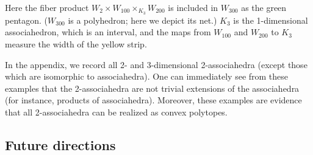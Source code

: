 \documentclass[11pt]{amsart}
\theoremstyle{definition}
\theoremstyle{remark}
\theoremstyle{plain}
\begin{document}
\begin{enumerate}
\begin{enumerate}
\begin{figure}[H]
\centering
\def\svgwidth{0.85\columnwidth}

\end{figure}

\noindent
Here the fiber product $W_2 \times W_{100} \times_{K_3} W_{200}$ is included in $W_{300}$ as the green pentagon.
($W_{300}$ is a polyhedron; here we depict its net.)
$K_3$ is the 1-dimensional associahedron, which is an interval, and the maps from $W_{100}$ and $W_{200}$ to $K_3$ measure the width of the yellow strip.
\end{enumerate}

\medskip

\noindent{\bf\S\ref{app:ex}:}
In the appendix, we record all 2- and 3-dimensional 2-associahedra (except those which are isomorphic to associahedra).
One can immediately see from these examples that the 2-associahedra are not trivial extensions of the associahedra (for instance, products of associahedra).
Moreover, these examples are evidence that all 2-associahedra can be realized as convex polytopes.
\end{enumerate}

\subsection{Future directions}
\end{document}
